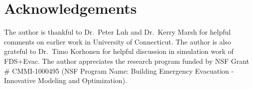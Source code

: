 \documentclass{article}
\begin{document}
\chapter*{Acknowledgements}

\noindent The author is thankful to Dr.\ Peter Luh and Dr.\ Kerry Marsh for helpful comments on earlier work in University of Connecticut.   The author is also grateful to Dr.\ Timo Korhonen for helpful discussion in simulation work of FDS+Evac.  The author appreciates the  research program funded by NSF Grant # CMMI-1000495 (NSF Program Name: Building Emergency Evacuation - Innovative Modeling and Optimization).  

\clearpage

\newpage

\renewcommand{\bibname}{References}
\end{document}
